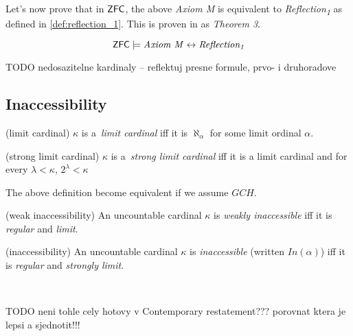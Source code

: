 Let's now prove that in $\sf{ZFC}$, the above \emph{Axiom M} is equivalent to \emph{Reflection\textsubscript{1}} as defined in \ref{def:reflection_1}. This is proven in \cite{Levy60a} as \emph{Theorem 3}. %
\begin{theorem}\label{theorem:levy_m_iff_reflection}
\begin{equation}
\sf{ZFC} \models \mbox{\emph{Axiom M}} \iff \mbox{\emph{Reflection\textsubscript{1}}}
\end{equation}
\end{theorem}

TODO nedosazitelne kardinaly -- reflektuj presne formule, prvo- i druhoradove

\subsection{Inaccessibility}\label{section:inaccessibility}
\begin{definition}{(limit cardinal)}\label{def:limit}
$\kappa$ is a~\emph{limit cardinal} iff it is $\aleph_\alpha$ for some limit ordinal $\alpha$.
\end{definition}

\begin{definition}{(strong limit cardinal)}\label{def:strong_limit}
$\kappa$ is a~\emph{strong limit cardinal} iff it is a limit cardinal and for every $\lambda < \kappa$, $2^\lambda < \kappa$
\end{definition}

The above definition become equivalent if we assume $GCH$.

\begin{definition}{(weak inaccessibility)}\label{def:weakly_inaccessible}
An uncountable cardinal $\kappa$ is \emph{weakly inaccessible} iff it is \emph{regular} and \emph{limit}.
\end{definition}
\begin{definition}(inaccessibility)\label{def:inaccessible}
An uncountable cardinal $\kappa$ is \emph{inaccessible} (written $In(\alpha)$) iff it is \emph{regular} and \emph{strongly limit}.
\end{definition}

\

TODO neni tohle cely hotovy v Contemporary restatement??? porovnat ktera je lepsi a sjednotit!!!

